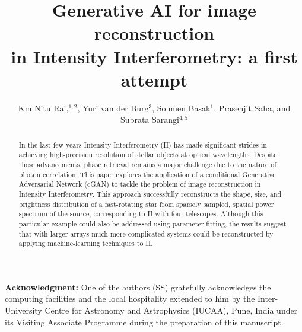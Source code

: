 \documentclass[twocolumn]{emulateapj}
\begin{document}
\title{Generative AI for image reconstruction\\ in Intensity Interferometry: a first attempt}

\author{Km Nitu Rai,$^{1,2}$, Yuri van der Burg$^{3}$, Soumen
  Basak$^{1}$, {Prasenjit Saha}, and Subrata Sarangi$^{4,5}$}








\begin{abstract}
In the last few years Intensity Interferometry (II) has made significant strides in achieving high-precision resolution of stellar objects at optical wavelengths. Despite these advancements, phase retrieval remains a major challenge due to the nature of photon correlation. This paper explores the application of a conditional Generative Adversarial Network (cGAN) to tackle the problem of image reconstruction in Intensity Interferometry. This approach successfully reconstructs the shape, size, and brightness distribution of a fast-rotating star from sparsely sampled, spatial power spectrum of the source, corresponding to II with four telescopes.  Although this particular example could also be addressed using parameter fitting, the results suggest that with larger arrays much more complicated systems could be reconstructed by applying machine-learning techniques to II.
\end{abstract}

\maketitle







\begin{acknowledgements}
\textbf{Acknowledgment:} One of the authors (SS) gratefully acknowledges the computing facilities and the local hospitality extended to him by the Inter-University Centre for Astronomy and Astrophysics (IUCAA), Pune, India under its Visiting Associate Programme during the preparation of this manuscript.
\end{acknowledgements}



\end{document}
